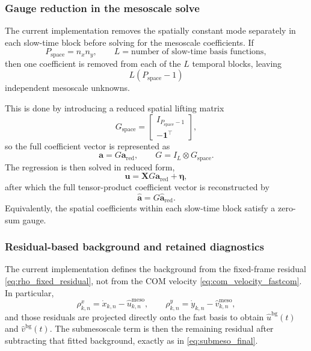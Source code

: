 \subsubsection{Gauge reduction in the mesoscale solve}

The current implementation removes the spatially constant mode separately in each slow-time
block before solving for the mesoscale coefficients. If
\begin{equation}
P_{\mathrm{space}} = n_x n_y,
\qquad
L = \text{number of slow-time basis functions},
\end{equation}
then one coefficient is removed from each of the $L$ temporal blocks, leaving
\begin{equation}
L(P_{\mathrm{space}}-1)
\end{equation}
independent mesoscale unknowns.

This is done by introducing a reduced spatial lifting matrix
\begin{equation}
G_{\mathrm{space}} =
\begin{bmatrix}
I_{P_{\mathrm{space}}-1}
\\
-\mathbf{1}^\top
\end{bmatrix},
\end{equation}
so the full coefficient vector is represented as
\begin{equation}
\mathbf{a} = G \mathbf{a}_{\mathrm{red}},
\qquad
G = I_L \otimes G_{\mathrm{space}}.
\end{equation}
The regression is then solved in reduced form,
\begin{equation}
\mathbf{u} = \mathbf{X}G \mathbf{a}_{\mathrm{red}} + \boldsymbol{\eta},
\end{equation}
after which the full tensor-product coefficient vector is reconstructed by
\begin{equation}
\hat{\mathbf{a}} = G \hat{\mathbf{a}}_{\mathrm{red}}.
\end{equation}
Equivalently, the spatial coefficients within each slow-time block satisfy a zero-sum gauge.

\subsubsection{Residual-based background and retained diagnostics}

The current implementation defines the background from the fixed-frame residual
\eqref{eq:rho_fixed_residual}, not from the COM velocity \eqref{eq:com_velocity_fastcom}. In
particular,
\begin{equation}
\rho^x_{k,n} = \dot{x}_{k,n} - \hat{u}^{\mathrm{meso}}_{k,n},
\qquad
\rho^y_{k,n} = \dot{y}_{k,n} - \hat{v}^{\mathrm{meso}}_{k,n},
\end{equation}
and those residuals are projected directly onto the fast basis to obtain
$\hat{u}^{\mathrm{bg}}(t)$ and $\hat{v}^{\mathrm{bg}}(t)$. The submesoscale term is then the
remaining residual after subtracting that fitted background, exactly as in
\eqref{eq:submeso_final}.

